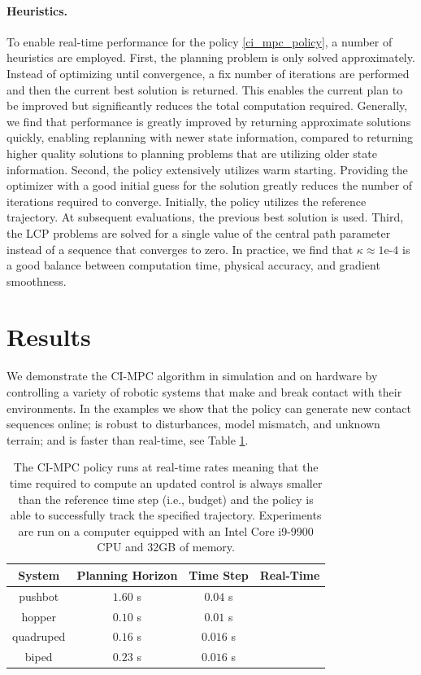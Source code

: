 \paragraph{Heuristics.}
To enable real-time performance for the policy \eqref{ci_mpc_policy}, a number of heuristics are employed. First, the planning problem is only solved approximately. Instead of optimizing until convergence, a fix number of iterations are performed and then the current best solution is returned. This enables the current plan to be improved but significantly reduces the total computation required. Generally, we find that performance is greatly improved by returning approximate solutions quickly, enabling replanning with newer state information, compared to returning higher quality solutions to planning problems that are utilizing older state information. Second, the policy extensively utilizes warm starting. Providing the optimizer with a good initial guess for the solution greatly reduces the number of iterations required to converge. Initially, the policy utilizes the reference trajectory. At subsequent evaluations, the previous best solution is used.
Third, the LCP problems are solved for a single value of the central path parameter instead of a sequence that converges to zero. In practice, we find that $\kappa \approx 1\mbox{e-}4$ is a good balance between computation time, physical accuracy, and gradient smoothness. 

\section{Results} \label{cipc_results}

We demonstrate the CI-MPC algorithm in simulation and on hardware by controlling a variety of robotic systems that make and break contact with their environments. In the examples we show that the policy can generate new contact sequences online; is robust to disturbances, model mismatch, and unknown terrain; and is faster than real-time, see Table \ref{cipc_timing_table}. 

\begin{table}[H]
	\centering
	\caption[CI-MPC real-time performance in simulation]{The CI-MPC policy runs at real-time rates meaning that the time required to compute an updated control is always smaller than the reference time step (i.e., budget) and the policy is able to successfully track the specified trajectory. Experiments are run on a computer equipped with an Intel Core i9-9900 CPU and 32GB of memory.}
	\begin{tabular}{c c c c}
		\toprule
		\textbf{System} &
		\textbf{Planning Horizon} &
		\textbf{Time Step} & 
		\textbf{Real-Time} \\
		\toprule
		pushbot          & $1.60$ s & $0.04$ s & \checkmark \\ 
		hopper           & $0.10$ s & $0.01$ s & \checkmark \\ 
		quadruped        & $0.16$ s & $0.016$ s & \checkmark \\
		biped            & $0.23$ s & $0.016$ s & \checkmark \\
		\toprule
	\end{tabular}
	\label{cipc_timing_table}
\end{table}
 

